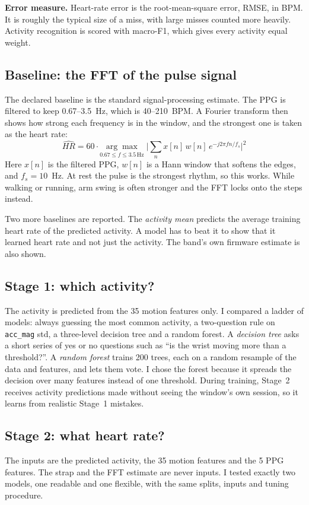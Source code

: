 \documentclass[conference]{IEEEtran}
\begin{document}
\textbf{Error measure.} Heart-rate error is the root-mean-square error, RMSE, in BPM. It is roughly the typical size of a miss, with large misses counted more heavily. Activity recognition is scored with macro-F1, which gives every activity equal weight.

\subsection{Baseline: the FFT of the pulse signal}
The declared baseline is the standard signal-processing estimate. The PPG is filtered to keep 0.67--3.5~Hz, which is 40--210~BPM. A Fourier transform then shows how strong each frequency is in the window, and the strongest one is taken as the heart rate:
\begin{equation}
\widehat{HR} = 60 \cdot \underset{0.67 \le f \le 3.5\,\text{Hz}}{\arg\max}\; \Big|\sum_n x[n]\,w[n]\,e^{-j2\pi f n / f_s}\Big|^2
\end{equation}
Here $x[n]$ is the filtered PPG, $w[n]$ is a Hann window that softens the edges, and $f_s = 10$~Hz. At rest the pulse is the strongest rhythm, so this works. While walking or running, arm swing is often stronger and the FFT locks onto the steps instead.

Two more baselines are reported. The \emph{activity mean} predicts the average training heart rate of the predicted activity. A model has to beat it to show that it learned heart rate and not just the activity. The band's own firmware estimate is also shown.

\subsection{Stage 1: which activity?}
The activity is predicted from the 35 motion features only. I compared a ladder of models: always guessing the most common activity, a two-question rule on \texttt{acc\_mag} std, a three-level decision tree and a random forest. A \emph{decision tree} asks a short series of yes or no questions such as ``is the wrist moving more than a threshold?''. A \emph{random forest} trains 200 trees, each on a random resample of the data and features, and lets them vote. I chose the forest because it spreads the decision over many features instead of one threshold. During training, Stage~2 receives activity predictions made without seeing the window's own session, so it learns from realistic Stage~1 mistakes.

\subsection{Stage 2: what heart rate?}
The inputs are the predicted activity, the 35 motion features and the 5 PPG features. The strap and the FFT estimate are never inputs. I tested exactly two models, one readable and one flexible, with the same splits, inputs and tuning procedure.
\end{document}

